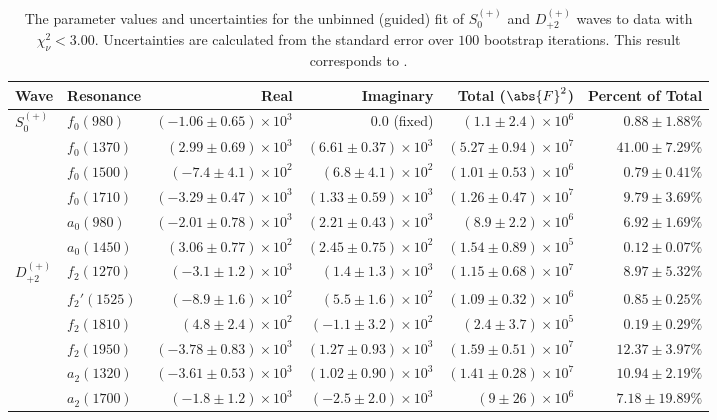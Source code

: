 \begin{table}[ht]
    \begin{center}
        \begin{tabular}{llrrrr}\toprule
        Wave & Resonance & Real & Imaginary & Total ($\abs{F}^2$) & Percent of Total \\\midrule
$S_{0}^{(+)}$ & $f_{0}(980)$ & $(-1.06 \pm 0.65) \times 10^{3}$ & $0.0$ (fixed) & $(1.1 \pm 2.4) \times 10^{6}$ & $0.88 \pm 1.88 \%$ \\
 & $f_{0}(1370)$ & $(2.99 \pm 0.69) \times 10^{3}$ & $(6.61 \pm 0.37) \times 10^{3}$ & $(5.27 \pm 0.94) \times 10^{7}$ & $41.00 \pm 7.29 \%$ \\
 & $f_{0}(1500)$ & $(-7.4 \pm 4.1) \times 10^{2}$ & $(6.8 \pm 4.1) \times 10^{2}$ & $(1.01 \pm 0.53) \times 10^{6}$ & $0.79 \pm 0.41 \%$ \\
 & $f_{0}(1710)$ & $(-3.29 \pm 0.47) \times 10^{3}$ & $(1.33 \pm 0.59) \times 10^{3}$ & $(1.26 \pm 0.47) \times 10^{7}$ & $9.79 \pm 3.69 \%$ \\
 & $a_{0}(980)$ & $(-2.01 \pm 0.78) \times 10^{3}$ & $(2.21 \pm 0.43) \times 10^{3}$ & $(8.9 \pm 2.2) \times 10^{6}$ & $6.92 \pm 1.69 \%$ \\
 & $a_{0}(1450)$ & $(3.06 \pm 0.77) \times 10^{2}$ & $(2.45 \pm 0.75) \times 10^{2}$ & $(1.54 \pm 0.89) \times 10^{5}$ & $0.12 \pm 0.07 \%$ \\
$D_{+2}^{(+)}$ & $f_{2}(1270)$ & $(-3.1 \pm 1.2) \times 10^{3}$ & $(1.4 \pm 1.3) \times 10^{3}$ & $(1.15 \pm 0.68) \times 10^{7}$ & $8.97 \pm 5.32 \%$ \\
 & $f_{2}'(1525)$ & $(-8.9 \pm 1.6) \times 10^{2}$ & $(5.5 \pm 1.6) \times 10^{2}$ & $(1.09 \pm 0.32) \times 10^{6}$ & $0.85 \pm 0.25 \%$ \\
 & $f_{2}(1810)$ & $(4.8 \pm 2.4) \times 10^{2}$ & $(-1.1 \pm 3.2) \times 10^{2}$ & $(2.4 \pm 3.7) \times 10^{5}$ & $0.19 \pm 0.29 \%$ \\
 & $f_{2}(1950)$ & $(-3.78 \pm 0.83) \times 10^{3}$ & $(1.27 \pm 0.93) \times 10^{3}$ & $(1.59 \pm 0.51) \times 10^{7}$ & $12.37 \pm 3.97 \%$ \\
 & $a_{2}(1320)$ & $(-3.61 \pm 0.53) \times 10^{3}$ & $(1.02 \pm 0.90) \times 10^{3}$ & $(1.41 \pm 0.28) \times 10^{7}$ & $10.94 \pm 2.19 \%$ \\
 & $a_{2}(1700)$ & $(-1.8 \pm 1.2) \times 10^{3}$ & $(-2.5 \pm 2.0) \times 10^{3}$ & $(9 \pm 26) \times 10^{6}$ & $7.18 \pm 19.89 \%$ \\\bottomrule
        \end{tabular}
    \caption{The parameter values and uncertainties for the unbinned (guided) fit of $S_{0}^{(+)}$ and $D_{+2}^{(+)}$ waves to data with $\chi^2_\nu < 3.00$. Uncertainties are calculated from the standard error over $100$ bootstrap iterations. This result corresponds to .}\label{tab:unbinned-fit-chisqdof-3.0-guided-Sp0p-Dp2p}
    \end{center}
\end{table}

